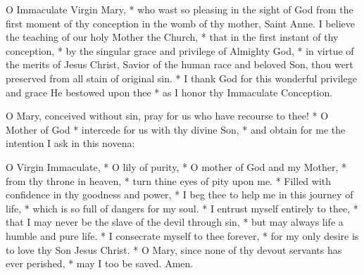 {\centering\Large{\MakeUppercase{}}\par}


\begin{enpars}
\lettrine{O}{} Immaculate Virgin Mary, * who wast so pleasing in the sight of God from the first moment of thy conception in the womb of thy mother, Saint Anne. I believe the teaching of our holy Mother the Church, * that in the first instant of thy conception, * by the singular grace and privilege of Almighty God, * in virtue of the merits of Jesus Christ, Savior of the human race and beloved Son, thou wert preserved from all stain of original sin. * I thank God for this wonderful privilege and grace He bestowed upon thee * as I honor thy Immaculate Conception.

\lettrine{O}{} Mary, conceived without sin, pray for us who have recourse to thee! * O Mother of God * intercede for us with thy divine Son, * and obtain for me the intention I ask in this novena:


\lettrine{O}{} Virgin Immaculate, * O lily of purity, * O mother of God and my Mother, * from thy throne in heaven, * turn thine eyes of pity upon me. * Filled with confidence in thy goodness and power, * I beg thee to help me in this journey of life, * which is so full of dangers for my soul. * I entrust myself entirely to thee, * that I may never be the slave of the devil through sin, * but may always life a humble and pure life. * I consecrate myself to thee forever, * for my only desire is to love thy Son Jesus Christ. * O Mary, since none of thy devout servants has ever perished, * may I too be saved. Amen.

\end{enpars}
